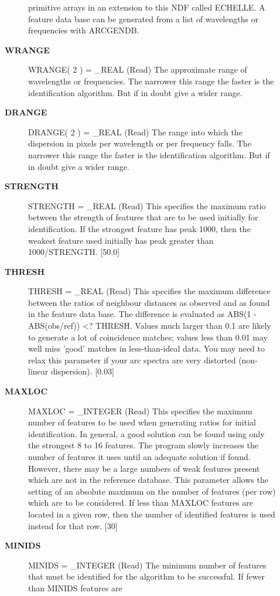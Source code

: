 \begin{description}
\begin{description}
   primitive arrays in an extension to this NDF called ECHELLE.
   A feature data base can be generated from a list of wavelengths
   or frequencies with ARCGENDB.
\item [\textbf{WRANGE}]
WRANGE( 2 ) = \_REAL (Read)
   The approximate range of wavelengths or frequencies. The
   narrower this range the faster is the identification algorithm.
   But if in doubt give a wider range.
\item [\textbf{DRANGE}]
DRANGE( 2 ) = \_REAL (Read)
   The range into which the dispersion in pixels per wavelength or
   per frequency falls. The narrower this range the faster is the
   identification algorithm. But if in doubt give a wider range.
\item [\textbf{STRENGTH}]
STRENGTH = \_REAL (Read)
   This specifies the maximum ratio between the strength of
   features that are to be used initially for identification. If
   the strongest feature has peak 1000, then the weakest
   feature used initially has peak greater than 1000/STRENGTH.
   [50.0]
\item [\textbf{THRESH}]
THRESH = \_REAL (Read)
   This specifies the maximum difference between the ratios of
   neighbour distances as observed and as found in the feature
   data base. The difference is evaluated as
      ABS(1 - ABS(obs/ref)) <? THRESH.
   Values much larger than 0.1 are likely to generate a lot of
   coincidence matches; values less than 0.01 may well miss 'good'
   matches in less-than-ideal data. You may need to relax this
   parameter if your arc spectra are very distorted (non-linear
   dispersion). [0.03]
\item [\textbf{MAXLOC}]
MAXLOC = \_INTEGER (Read)
   This specifies the maximum number of features to be used when
   generating ratios for initial identification. In general, a
   good solution can be found using only the strongest 8 to 16
   features. The program slowly increases the number of features
   it uses until an adequate solution if found. However, there may
   be a large numbers of weak features present which are not in
   the reference database. This parameter allows the setting of an
   absolute maximum on the number of features (per row) which
   are to be considered. If less than MAXLOC features are located
   in a given row, then the number of identified features is used
   instead for that row. [30]
\item [\textbf{MINIDS}]
MINIDS = \_INTEGER (Read)
   The minimum number of features that must be identified for the
   algorithm to be successful. If fewer than MINIDS features are

\end{description}
\end{description}
